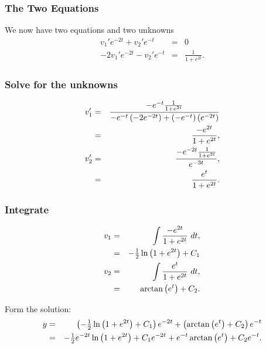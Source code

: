 \begin{frame}
  \frametitle{The Two Equations}

  We now have two equations and two unknowns
  \begin{eqnarray*}
    v_1'e^{-2t} + v_2' e^{-t}& = & 0 \\
    -2 v_1' e^{-2t}  - v_2' e^{-t} & = & \frac{1}{1+e^{2t}}. 
  \end{eqnarray*}

\end{frame}

\begin{frame}
  \frametitle{Solve for the unknowns}
  \begin{eqnarray*}
    v_1' & = & \frac{-e^{-t} \frac{1}{1+e^{2t}}}{
      -e^{-t}\left( -2 e^{-2t} \right) + \left( - e^{-t}\right) \left( e^{-2t} \right)} \\
    & = & \frac{-e^{2t}}{1+e^{2t}}, \\
    v_2' & = & \frac{-e^{-2t}\frac{1}{1+e^{2t}}}{e^{-3t}}, \\
    & = & \frac{e^t}{1+e^{2t}}.
  \end{eqnarray*}
\end{frame}

\begin{frame}
  \frametitle{Integrate}
  
  \begin{eqnarray*}
    v_1 & = & \int \frac{-e^{2t}}{1+e^{2t}} ~ dt, \\
    & = & -\mbox{$\frac{1}{2}$} \ln\left( 1 + e^{2t} \right) + C_1 \\
    v_2 & = & \int \frac{e^t}{1+e^{2t}} ~ dt, \\
    & = & \arctan\left( e^t \right) + C_2.
  \end{eqnarray*}

  Form the solution:
  \begin{eqnarray*}
    y & = & \left( -\mbox{$\frac{1}{2}$} \ln\left( 1 + e^{2t} \right) + C_1 \right) e^{-2t} + \left( \arctan\left( e^t \right) + C_2 \right) e^{-t} \\
    & = & -\mbox{$\frac{1}{2}$} e^{-2t} \ln \left( 1 + e^{2t} \right) + C_1 e^{-2t} + e^{-t} \arctan\left( e^t \right) + C_2 e^{-t}.
  \end{eqnarray*}

\end{frame}


